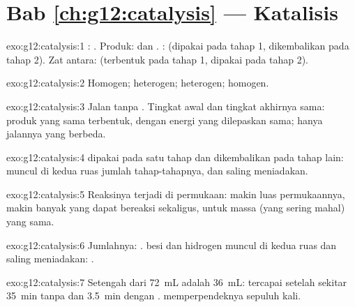 \section*{Bab \ref{ch:g12:catalysis} --- Katalisis}

\begin{solution}{exo:g12:catalysis:1}
: . Produk:  dan . : 
(dipakai pada tahap 1, dikembalikan pada tahap 2). Zat antara:
 (terbentuk pada tahap 1, dipakai pada tahap 2).
\end{solution}

\begin{solution}{exo:g12:catalysis:2}
Homogen; heterogen; heterogen; homogen.
\end{solution}

\begin{solution}{exo:g12:catalysis:3}
Jalan tanpa . Tingkat awal dan tingkat akhirnya sama: produk
yang sama terbentuk, dengan energi yang dilepaskan sama; hanya jalannya
yang berbeda.
\end{solution}

\begin{solution}{exo:g12:catalysis:4}
 dipakai pada satu tahap dan dikembalikan pada tahap lain:
 muncul di kedua ruas jumlah tahap-tahapnya, dan saling
meniadakan.
\end{solution}

\begin{solution}{exo:g12:catalysis:5}
Reaksinya terjadi di permukaan: makin luas permukaannya, makin banyak
 yang dapat bereaksi sekaligus, untuk massa  (yang sering
mahal) yang sama.
\end{solution}

\begin{solution}{exo:g12:catalysis:6}
Jumlahnya: .  besi dan  hidrogen muncul di kedua
ruas dan saling meniadakan: .
\end{solution}

\begin{solution}{exo:g12:catalysis:7}
Setengah dari \qty{72}{mL} adalah \qty{36}{mL}: tercapai setelah sekitar
\qty{35}{min} tanpa  dan \qty{3.5}{min} dengan . 
memperpendeknya sepuluh kali.
\end{solution}

